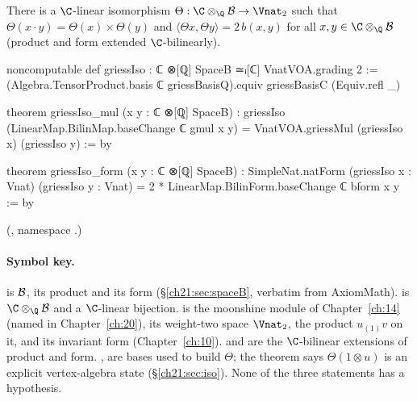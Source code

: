\begin{theorem}\label{ch21:thm:intro}
There is a $\C$-linear isomorphism $\Theta:\C\otimes_\Q\chXXIB\to\Vnat_2$ such that
$\Theta(x\cdot y)=\Theta(x)\times\Theta(y)$ and $\langle\Theta x,\Theta y\rangle=2\,b(x,y)$ for all
$x,y\in\C\otimes_\Q\chXXIB$ (product and form extended $\C$-bilinearly).
\end{theorem}
\begin{leancode}
noncomputable def griessIso : ℂ ⊗[ℚ] SpaceB ≃ₗ[ℂ] VnatVOA.grading 2 :=
  (Algebra.TensorProduct.basis ℂ griessBasisQ).equiv griessBasisC (Equiv.refl _)
\end{leancode}
\begin{leancode}
theorem griessIso_mul (x y : ℂ ⊗[ℚ] SpaceB) :
    griessIso (LinearMap.BilinMap.baseChange ℂ gmul x y)
      = VnatVOA.griessMul (griessIso x) (griessIso y) := by
\end{leancode}
\begin{leancode}
theorem griessIso_form (x y : ℂ ⊗[ℚ] SpaceB) :
    SimpleNat.natForm (griessIso x : Vnat) (griessIso y : Vnat)
      = 2 * LinearMap.BilinForm.baseChange ℂ bform x y := by
\end{leancode}
(, namespace
.)

\paragraph{Symbol key.}   is $\mathcal{B}$,  its product and  its form
(\S\ref{ch21:sec:spaceB}, verbatim from AxiomMath).   is $\C\otimes_\Q\chXXIB$ and
 a $\C$-linear bijection.   is the moonshine module of Chapter~\ref{ch:14}
(named in Chapter~\ref{ch:20}),  its weight-two space $\Vnat_2$,
 the product $u_{(1)}v$ on it, and  its invariant form
(Chapter~\ref{ch:10}).   and
 are the $\C$-bilinear extensions of product and form.
,  are bases used to build $\Theta$; the theorem
 says $\Theta(1\otimes u)$ is an explicit vertex-algebra state
(\S\ref{ch21:sec:iso}).  None of the three statements has a hypothesis.

